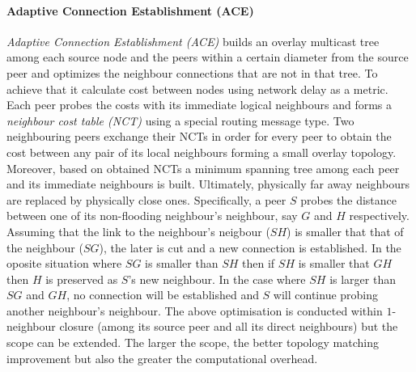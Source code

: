 %
%
%

\paragraph*{\bf Adaptive Connection Establishment (ACE)}
\emph{Adaptive Connection Establishment (ACE)} \cite{liu_ace_2004} builds an
overlay multicast tree among each source node and the peers within a certain
diameter from the source peer and optimizes the neighbour connections that are
not in that tree. To achieve that it calculate cost between nodes using network
delay as a metric. Each peer probes the costs with its immediate logical
neighbours and forms a \emph{neighbour cost table (NCT)} using a special
routing message type. Two neighbouring peers exchange their NCTs in order for
every peer to obtain the cost between any pair of its local neighbours forming a
small overlay topology. Moreover, based on obtained NCTs a minimum spanning tree
among each peer and its immediate neighbours is built. Ultimately, physically
far away neighbours are replaced by physically close ones. Specifically, a peer
$S$ probes the distance between one of its non-flooding neighbour's neighbour,
say $G$ and $H$ respectively. Assuming that the link to the neighbour's neigbour
($SH$) is smaller that that of the neighbour ($SG$), the later is cut and a new
connection is established. In the oposite situation where $SG$ is smaller than
$SH$ then if $SH$ is smaller that $GH$ then $H$ is preserved as $S$'s new
neighbour. In the case where $SH$ is larger than $SG$ and $GH$, no connection
will be established and $S$ will continue probing another neighbour's neighbour.
The above optimisation is conducted within $1$-neighbour closure (among its
source peer and all its direct neighbours) but the scope can be extended. The
larger the scope, the better topology matching improvement but also the greater
the computational overhead.

